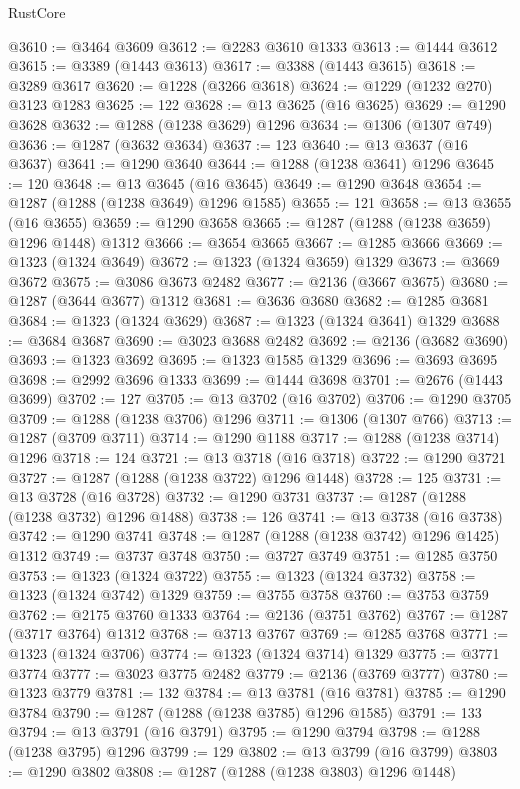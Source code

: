 \begin{lexlean}{RustCore}
\begin{coremodule}
@3610 := @3464 @3609
@3612 := @2283 @3610 @1333
@3613 := @1444 @3612
@3615 := @3389 (@1443 @3613)
@3617 := @3388 (@1443 @3615)
@3618 := @3289 @3617
@3620 := @1228 (@3266 @3618)
@3624 := @1229 (@1232 @270) @3123 @1283
@3625 := 122
@3628 := @13 @3625 (@16 @3625)
@3629 := @1290 @3628
@3632 := @1288 (@1238 @3629) @1296
@3634 := @1306 (@1307 @749)
@3636 := @1287 (@3632 @3634)
@3637 := 123
@3640 := @13 @3637 (@16 @3637)
@3641 := @1290 @3640
@3644 := @1288 (@1238 @3641) @1296
@3645 := 120
@3648 := @13 @3645 (@16 @3645)
@3649 := @1290 @3648
@3654 := @1287 (@1288 (@1238 @3649) @1296 @1585)
@3655 := 121
@3658 := @13 @3655 (@16 @3655)
@3659 := @1290 @3658
@3665 := @1287 (@1288 (@1238 @3659) @1296 @1448) @1312
@3666 := @3654 @3665
@3667 := @1285 @3666
@3669 := @1323 (@1324 @3649)
@3672 := @1323 (@1324 @3659) @1329
@3673 := @3669 @3672
@3675 := @3086 @3673 @2482
@3677 := @2136 (@3667 @3675)
@3680 := @1287 (@3644 @3677) @1312
@3681 := @3636 @3680
@3682 := @1285 @3681
@3684 := @1323 (@1324 @3629)
@3687 := @1323 (@1324 @3641) @1329
@3688 := @3684 @3687
@3690 := @3023 @3688 @2482
@3692 := @2136 (@3682 @3690)
@3693 := @1323 @3692
@3695 := @1323 @1585 @1329
@3696 := @3693 @3695
@3698 := @2992 @3696 @1333
@3699 := @1444 @3698
@3701 := @2676 (@1443 @3699)
@3702 := 127
@3705 := @13 @3702 (@16 @3702)
@3706 := @1290 @3705
@3709 := @1288 (@1238 @3706) @1296
@3711 := @1306 (@1307 @766)
@3713 := @1287 (@3709 @3711)
@3714 := @1290 @1188
@3717 := @1288 (@1238 @3714) @1296
@3718 := 124
@3721 := @13 @3718 (@16 @3718)
@3722 := @1290 @3721
@3727 := @1287 (@1288 (@1238 @3722) @1296 @1448)
@3728 := 125
@3731 := @13 @3728 (@16 @3728)
@3732 := @1290 @3731
@3737 := @1287 (@1288 (@1238 @3732) @1296 @1488)
@3738 := 126
@3741 := @13 @3738 (@16 @3738)
@3742 := @1290 @3741
@3748 := @1287 (@1288 (@1238 @3742) @1296 @1425) @1312
@3749 := @3737 @3748
@3750 := @3727 @3749
@3751 := @1285 @3750
@3753 := @1323 (@1324 @3722)
@3755 := @1323 (@1324 @3732)
@3758 := @1323 (@1324 @3742) @1329
@3759 := @3755 @3758
@3760 := @3753 @3759
@3762 := @2175 @3760 @1333
@3764 := @2136 (@3751 @3762)
@3767 := @1287 (@3717 @3764) @1312
@3768 := @3713 @3767
@3769 := @1285 @3768
@3771 := @1323 (@1324 @3706)
@3774 := @1323 (@1324 @3714) @1329
@3775 := @3771 @3774
@3777 := @3023 @3775 @2482
@3779 := @2136 (@3769 @3777)
@3780 := @1323 @3779
@3781 := 132
@3784 := @13 @3781 (@16 @3781)
@3785 := @1290 @3784
@3790 := @1287 (@1288 (@1238 @3785) @1296 @1585)
@3791 := 133
@3794 := @13 @3791 (@16 @3791)
@3795 := @1290 @3794
@3798 := @1288 (@1238 @3795) @1296
@3799 := 129
@3802 := @13 @3799 (@16 @3799)
@3803 := @1290 @3802
@3808 := @1287 (@1288 (@1238 @3803) @1296 @1448)

\end{coremodule}
\end{lexlean}
